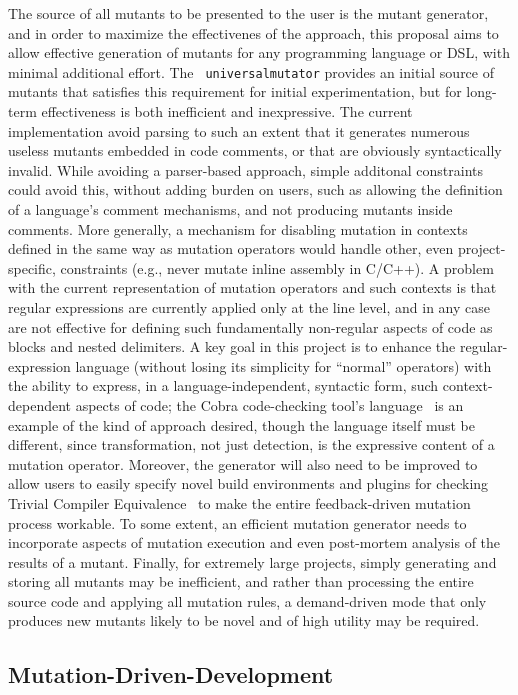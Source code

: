 The source of all mutants to be presented to the user is the mutant
generator, and in order to maximize the effectivenes of the approach,
this proposal aims to allow effective generation of mutants for any
programming 
language or DSL, with minimal additional effort.  The {\tt
  universalmutator} provides an initial source of mutants that
satisfies this requirement for initial experimentation, but for
long-term effectiveness is both inefficient and inexpressive.  The
current implementation avoid parsing to such an extent that it
generates numerous useless mutants embedded in code comments, or that
are obviously syntactically invalid.  While avoiding a parser-based
approach, simple additonal constraints could avoid this, without
adding burden on users, such as allowing the definition of a
language's comment mechanisms, and not producing mutants inside
comments.  More generally, a mechanism for disabling mutation in
contexts defined in the same way as mutation operators would handle
other, even project-specific, constraints (e.g., never mutate inline
assembly in C/C++).  A problem with the current representation of
mutation operators and such contexts is that regular expressions are
currently applied only at the line level, and in any case are not
effective for defining such fundamentally non-regular aspects of code
as blocks and nested delimiters.  A key goal in this project is to
enhance the regular-expression language (without losing its simplicity
for ``normal'' operators) with the ability to express, in a
language-independent, syntactic form, such context-dependent aspects
of code; the Cobra code-checking tool's language~\cite{Cobra} is an
example of the kind of approach desired, though the language itself
must be different, since transformation,
not just detection, is the expressive content of a mutation operator.
Moreover, the generator will also need to be improved to allow users
to easily specify novel build environments and plugins for checking
Trivial Compiler Equivalence~\cite{TCE} to make the entire feedback-driven
mutation process workable.  To some extent, an efficient mutation
generator needs to incorporate aspects of mutation execution and even
post-mortem analysis of the results of a mutant.  Finally, for
extremely large projects, simply generating and storing all mutants
may be inefficient, and rather than processing the entire source code
and applying all mutation rules, a demand-driven mode that only
produces new mutants likely to be novel and of high utility may be required.

\subsection{Mutation-Driven-Development}

